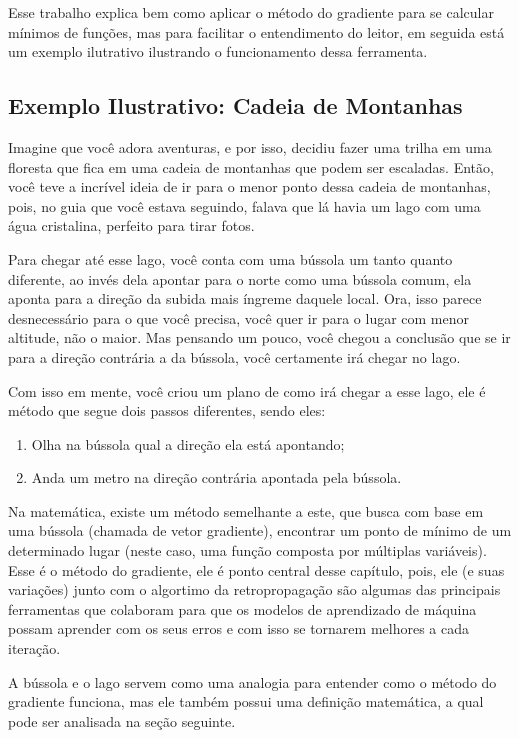 Esse trabalho explica bem como aplicar o método do gradiente para se calcular mínimos de funções, mas para facilitar o entendimento do leitor, em seguida está um exemplo ilutrativo ilustrando o funcionamento dessa ferramenta.

\subsection{Exemplo Ilustrativo: Cadeia de Montanhas}

Imagine que você adora aventuras, e por isso, decidiu fazer uma trilha em uma floresta que fica em uma cadeia de montanhas que podem ser escaladas. Então, você teve a incrível ideia de ir para o menor ponto dessa cadeia de montanhas, pois, no guia que você estava seguindo, falava que lá havia um lago com uma água cristalina, perfeito para tirar fotos.

Para chegar até esse lago, você conta com uma bússola um tanto quanto diferente, ao invés dela apontar para o norte como uma bússola comum, ela aponta para a direção da subida mais íngreme daquele local. Ora, isso parece desnecessário para o que você precisa, você quer ir para o lugar com menor altitude, não o maior. Mas pensando um pouco, você chegou a conclusão que se ir para a direção contrária a da bússola, você certamente irá chegar no lago.

Com isso em mente, você criou um plano de como irá chegar a esse lago, ele é método que segue dois passos diferentes, sendo eles:

\begin{enumerate}
    \item Olha na bússola qual a direção ela está apontando;
    \item Anda um metro na direção contrária apontada pela bússola.
\end{enumerate}

Na matemática, existe um método semelhante a este, que busca com base em uma bússola (chamada de vetor gradiente), encontrar um ponto de mínimo de um determinado lugar (neste caso, uma função composta por múltiplas variáveis). Esse é o método do gradiente, ele é ponto central desse capítulo, pois, ele (e suas variações) junto com o algortimo da retropropagação são algumas das principais ferramentas que colaboram para que os modelos de aprendizado de máquina possam aprender com os seus erros e com isso se tornarem melhores a cada iteração.

A bússola e o lago servem como uma analogia para entender como o método do gradiente funciona, mas ele também possui uma definição matemática, a qual pode ser analisada na seção seguinte.

